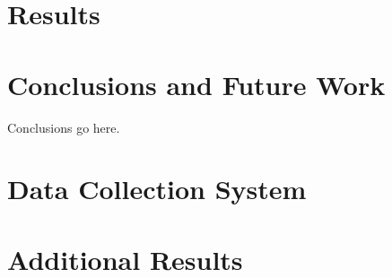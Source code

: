 \documentclass{article}
\begin{document}
\section{Results}


\section{Conclusions and Future Work}
Conclusions go here.




\newpage

\begin{appendices}
  \section{Data Collection System}
  
  
  \section{Additional Results}
  
\end{appendices}
\end{document}
